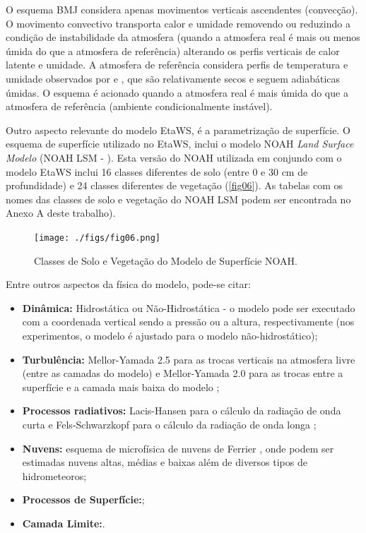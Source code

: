 O esquema BMJ considera apenas movimentos verticais ascendentes (convecção). O movimento convectivo transporta calor e umidade removendo ou reduzindo a condição de instabilidade da atmosfera (quando a atmosfera real é mais ou menos úmida do que a atmosfera de referência) alterando os perfis verticais de calor latente e umidade. A atmosfera de referência considera perfis de temperatura e umidade observados por \cite{betts86} e \cite{bettsmiller86}, que são relativamente secos e seguem adiabáticas úmidas. O esquema é acionado quando a atmosfera real é mais úmida do que a atmosfera de referência (ambiente condicionalmente instável).

Outro aspecto relevante do modelo EtaWS, é a parametrização de superfície. O esquema de superfície utilizado no EtaWS, inclui o modelo NOAH \textit{Land Surface Modelo} (NOAH LSM - \cite{mitchell01}). Esta versão do NOAH utilizada em conjundo com o modelo EtaWS inclui 16 classes diferentes de solo (entre 0 e 30 cm de profundidade) e 24 classes diferentes de vegetação (\autoref{fig06}). As tabelas com os nomes das classes de solo e vegetação do NOAH LSM podem ser encontrada no Anexo A deste trabalho).

\begin{figure}
\centering
\texttt{[image: ./figs/fig06.png]}
\caption{Classes de Solo e Vegetação do Modelo de Superfície NOAH.}
\label{fig06}
\end{figure}

Entre outros aspectos da física do modelo, pode-se citar:

\begin{itemize}
\item \textbf{Dinâmica:} Hidrostática ou Não-Hidrostática - o modelo pode ser executado com a coordenada vertical sendo a pressão ou a altura, respectivamente (nos experimentos, o modelo é ajustado para o modelo não-hidrostático);
\item \textbf{Turbulência:} Mellor-Yamada 2.5 para as trocas verticais na atmosfera livre (entre as camadas do modelo) e Mellor-Yamada 2.0 para as trocas entre a superfície e a camada mais baixa do modelo \cite{melloryamada74};
\item \textbf{Processos radiativos:} Lacis-Hansen para o cálculo da radiação de onda curta \cite{lacishansen74} e Fels-Schwarzkopf para o cálculo da radiação de onda longa \cite{felsschwarzkopf75};
\item \textbf{Nuvens:} esquema de microfísica de nuvens de Ferrier \cite{ferrieretal02}, onde podem ser estimadas nuvens altas, médias e baixas além de diversos tipos de hidrometeoros;
\item \textbf{Processos de Superfície:};
\item \textbf{Camada Limite:}.
\end{itemize}

